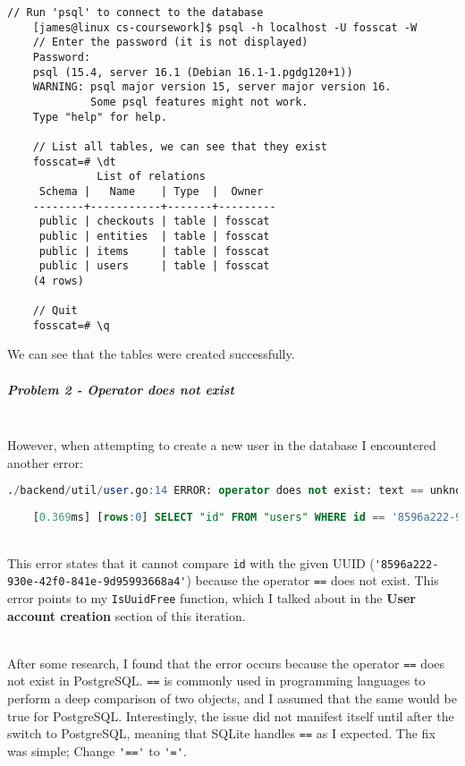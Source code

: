 \documentclass[../../main.tex]{subfiles}
\begin{document}
\begin{lstlisting}[language=custom_psql_commented]
    // Run 'psql' to connect to the database
    [james@linux cs-coursework]$ psql -h localhost -U fosscat -W
    // Enter the password (it is not displayed)
    Password: 
    psql (15.4, server 16.1 (Debian 16.1-1.pgdg120+1))
    WARNING: psql major version 15, server major version 16.
             Some psql features might not work.
    Type "help" for help.
    
    // List all tables, we can see that they exist
    fosscat=# \dt
              List of relations
     Schema |   Name    | Type  |  Owner  
    --------+-----------+-------+---------
     public | checkouts | table | fosscat
     public | entities  | table | fosscat
     public | items     | table | fosscat
     public | users     | table | fosscat
    (4 rows)
    
    // Quit
    fosscat=# \q
    \end{lstlisting}

\noindent We can see that the tables were created successfully.

\subparagraph{Problem 2 - Operator does not exist}

\noindent \\ However, when attempting to create a new user in the database I encountered another error:

\begin{lstlisting}[language=SQL]
    ./backend/util/user.go:14 ERROR: operator does not exist: text == unknown (SQLSTATE 42883)
    
    [0.369ms] [rows:0] SELECT "id" FROM "users" WHERE id == '8596a222-930e-42f0-841e-9d95993668a4' AND "users"."deleted_at" IS NULL ORDER BY "users"."id" LIMIT 1
    \end{lstlisting}

\noindent \\ This error states that it cannot compare \lstinline{id} with the given UUID (\lstinline{'8596a222-930e-42f0-841e-9d95993668a4'}) because the operator \lstinline{==} does not exist.
This error points to my \lstinline{IsUuidFree} function, which I talked about in the \textbf{User account creation} section of this iteration.

\noindent \\ After some research, I found that the error occurs because the operator \lstinline{==} does not exist in PostgreSQL. \lstinline{==} is commonly used in programming languages to perform a deep comparison of two objects, and I assumed that the same would be true for PostgreSQL.
Interestingly, the issue did not manifest itself until after the switch to PostgreSQL, meaning that SQLite handles \lstinline{==} as I expected.
The fix was simple; Change \lstinline{'=='} to \lstinline{'='}.
\end{document}
